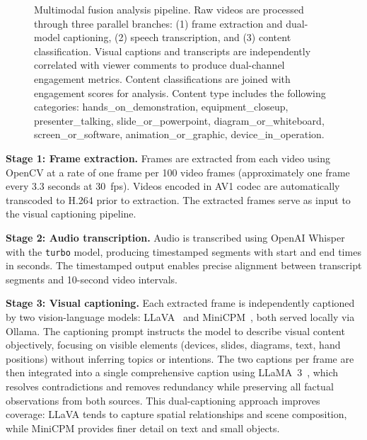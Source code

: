 \documentclass[fleqn,10pt]{wlscirep}
\begin{document}
\begin{figure}[t]
\caption{Multimodal fusion analysis pipeline. Raw videos are processed through three parallel branches: (1) frame extraction and dual-model captioning, (2) speech transcription, and (3) content classification. Visual captions and transcripts are independently correlated with viewer comments to produce dual-channel engagement metrics. Content classifications are joined with engagement scores for analysis. Content type includes the following categories: hands\_on\_demonstration, equipment\_closeup, presenter\_talking, slide\_or\_powerpoint, diagram\_or\_whiteboard, screen\_or\_software, animation\_or\_graphic, device\_in\_operation. }
\label{fig:pipeline}
\end{figure}

\textbf{Stage 1: Frame extraction.}
Frames are extracted from each video using OpenCV at a rate of one frame per 100 video frames (approximately one frame every 3.3 seconds at 30~fps). Videos encoded in AV1 codec are automatically transcoded to H.264 prior to extraction. The extracted frames serve as input to the visual captioning pipeline.

\textbf{Stage 2: Audio transcription.} Audio is transcribed using OpenAI Whisper~\cite{radford2023robust} with the \texttt{turbo} model, producing timestamped segments with start and end times in seconds. The timestamped output enables precise alignment between transcript segments and 10-second video intervals.

\textbf{Stage 3: Visual captioning.} Each extracted frame is independently captioned by two vision-language models: LLaVA~\cite{liu2023visual} and MiniCPM~\cite{yao2024minicpm}, both served locally via Ollama. The captioning prompt instructs the model to describe visual content objectively, focusing on visible elements (devices, slides, diagrams, text, hand positions) without inferring topics or intentions. The two captions per frame are then integrated into a single comprehensive caption using LLaMA~3~\cite{touvron2023llama}, which resolves contradictions and removes redundancy while preserving all factual observations from both sources. This dual-captioning approach improves coverage: LLaVA tends to capture spatial relationships and scene composition, while MiniCPM provides finer detail on text and small objects.
\end{document}
